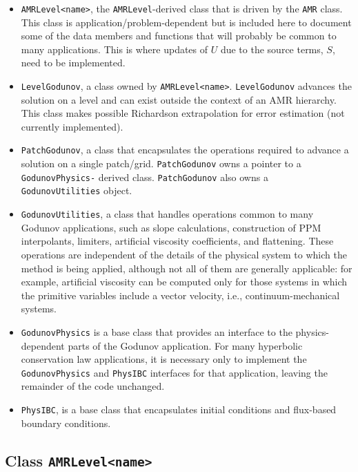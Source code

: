 \begin{itemize}
\item {\tt AMRLevel<name>}, the {\tt AMRLevel}-derived class
        that is driven by the {\tt AMR} class.  This class is
        application/problem-dependent but is included here to
        document some of the data members and functions that
        will probably be common to many applications.
        This is where updates of $U$ due to the source terms,
        $S$, need to be implemented.
\item {\tt LevelGodunov}, a class owned by {\tt AMRLevel<name>}.
        {\tt LevelGodunov} advances the solution on a level
        and can exist outside the context of an AMR hierarchy.
        This class makes possible Richardson extrapolation for
        error estimation (not currently implemented).
\item{\tt PatchGodunov}, a class that encapsulates the 
        operations required to advance a solution on a single
        patch/grid.  {\tt PatchGodunov} owns a pointer to 
	a {\tt GodunovPhysics-}
        derived class.   {\tt PatchGodunov} also owns a {\tt
        GodunovUtilities} object.
\item {\tt GodunovUtilities}, a class that handles operations
  common to many Godunov applications, such as slope calculations,
construction of PPM interpolants, limiters, artificial viscosity
coefficients, and flattening. These operations are independent of the
details of the physical system to which the method is being applied,
although not all of them are generally applicable: for example,
artificial viscosity can be computed only for those systems in which the
primitive variables include a vector velocity, i.e., continuum-mechanical
systems. 
\item {\tt GodunovPhysics} is a base class that provides an interface
  to the physics-dependent parts of the Godunov application.
  For many hyperbolic conservation law applications, it is necessary only to
  implement the {\tt GodunovPhysics} and {\tt PhysIBC} interfaces 
  for that application, leaving the remainder of the code unchanged.
\item {\tt PhysIBC}, is a base class that encapsulates 
        initial conditions and flux-based boundary conditions.
\end{itemize}

\subsection{Class {\tt AMRLevel<name>} }

